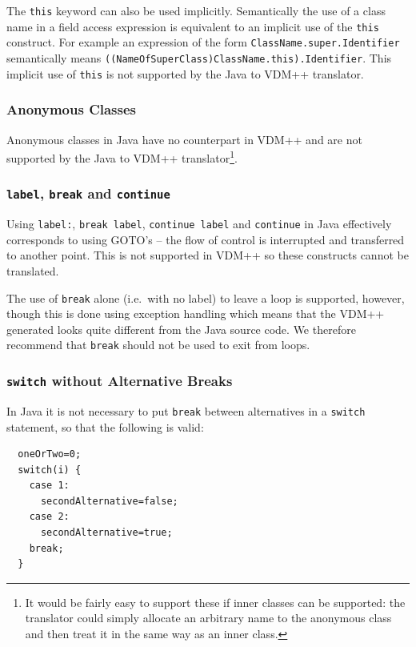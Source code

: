 \documentclass[\pformat,12pt]{article}
\begin{document}
The \texttt{this} keyword can also be used implicitly. Semantically
the use of a class name in a field access expression is equivalent to
an implicit use of the \texttt{this} construct. For example an
expression of the form \texttt{ClassName.super.Identifier}
semantically means \texttt{((NameOfSuperClass)ClassName.this).Identifier}. This
implicit use of \texttt{this} is not supported by the
Java to VDM++ translator.

\subsubsection{Anonymous Classes}

Anonymous classes in Java have no counterpart in VDM++ and are not
supported by the Java to VDM++ translator\footnote{It would be fairly
  easy to support these if inner classes can be supported: the translator
  could simply allocate an arbitrary name to the anonymous class and
  then treat it in the same way as an inner class.}. 

\subsubsection{\texttt{label}, \texttt{break} and \texttt{continue}}

Using \texttt{label:}, \texttt{break label}, \texttt{continue
  label} and \texttt{continue} in Java effectively corresponds to
  using GOTO's -- the flow of control is interrupted and transferred
  to another point. This is not supported in VDM++ so these constructs
  cannot be translated.

The use of \texttt{break} alone (i.e.\ with no label) to leave a loop
is supported, however, though this is done using exception handling
which means that the VDM++ generated looks quite different from the
Java source code. We therefore recommend that \texttt{break} should
not be used to exit from loops.

\subsubsection{\texttt{switch} without Alternative Breaks}

In Java it is not necessary to put \texttt{break} between alternatives
in a \texttt{switch} statement, so that the following is valid:

\begin{small}
\begin{verbatim}
  oneOrTwo=0;
  switch(i) {
    case 1:
      secondAlternative=false;
    case 2:
      secondAlternative=true;
    break;
  }
\end{verbatim}
\end{small}
\end{document}
